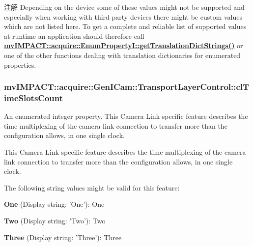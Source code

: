 \begin{DoxyNote}{注解}
Depending on the device some of these values might not be supported and especially when working with third party devices there might be custom values which are not listed here. To get a complete and reliable list of supported values at runtime an application should therefore call {\bfseries \hyperlink{classmv_i_m_p_a_c_t_1_1acquire_1_1_enum_property_i_a0ba6ccbf5ee69784d5d0b537924d26b6}{mv\+I\+M\+P\+A\+C\+T\+::acquire\+::\+Enum\+Property\+I\+::get\+Translation\+Dict\+Strings()}} or one of the other functions dealing with translation dictionaries for enumerated properties. 
\end{DoxyNote}
\hypertarget{classmv_i_m_p_a_c_t_1_1acquire_1_1_gen_i_cam_1_1_transport_layer_control_a11a7642037b030f135e45e7488be1d95}{
\subsubsection[{cl\+Time\+Slots\+Count}]{ mv\+I\+M\+P\+A\+C\+T\+::acquire\+::\+Gen\+I\+Cam\+::\+Transport\+Layer\+Control\+::cl\+Time\+Slots\+Count}}\label{classmv_i_m_p_a_c_t_1_1acquire_1_1_gen_i_cam_1_1_transport_layer_control_a11a7642037b030f135e45e7488be1d95}


An enumerated integer property. This Camera Link specific feature describes the time multiplexing of the camera link connection to transfer more than the configuration allows, in one single clock. 

This Camera Link specific feature describes the time multiplexing of the camera link connection to transfer more than the configuration allows, in one single clock.

The following string values might be valid for this feature\+:
\begin{DoxyItemize}
\item {\bfseries One} (Display string\+: 'One')\+: One
\item {\bfseries Two} (Display string\+: 'Two')\+: Two
\item {\bfseries Three} (Display string\+: 'Three')\+: Three
\end{DoxyItemize}

